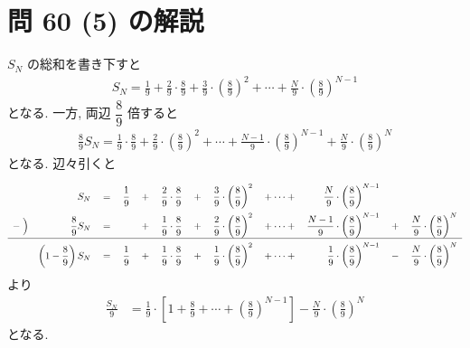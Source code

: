 
\section{問 60 (5) の解説}
\label{問 60 (5) の解説}
$S_{N}$ の総和を書き下すと
\begin{align}
	S_{N} = \frac{1}{9} + \frac{2}{9}\cdot\frac{8}{9} + \frac{3}{9}\cdot\left(\frac{8}{9}\right)^{2} + \cdots + \frac{N}{9}\cdot\left(\frac{8}{9}\right)^{N - 1}
\end{align}
となる.
一方, 両辺 $\dfrac{8}{9}$ 倍すると
\begin{align}
	\frac{8}{9}S_{N} = \frac{1}{9}\cdot\frac{8}{9} + \frac{2}{9}\cdot\left(\frac{8}{9}\right)^{2} + \cdots + \frac{N - 1}{9}\cdot\left(\frac{8}{9}\right)^{N - 1} + \frac{N}{9}\cdot\left(\frac{8}{9}\right)^{N}
\end{align}
となる.
辺々引くと
\begin{align}
	\def\arraystretch{2.5}
	\begin{array}{rrcrcrcrcrcr}
		        & S_{N}                              & {}={} & \dfrac{1}{9} & {}+{} & \dfrac{2}{9}\cdot\dfrac{8}{9} & {}+{} & \dfrac{3}{9}\cdot\left(\dfrac{8}{9}\right)^{2} & {}+ \cdots + {} & \dfrac{N}{9}\cdot\left(\dfrac{8}{9}\right)^{N - 1}     &       & \\
		-\Bigm) & \dfrac{8}{9}S_{N}                  & {}={} &              & {}+{} & \dfrac{1}{9}\cdot\dfrac{8}{9} & {}+{} & \dfrac{2}{9}\cdot\left(\dfrac{8}{9}\right)^{2} & {}+ \cdots + {} & \dfrac{N - 1}{9}\cdot\left(\dfrac{8}{9}\right)^{N - 1} & {}+{} & \dfrac{N}{9}\cdot\left(\dfrac{8}{9}\right)^{N} \\ \hline
		        & \left(1 - \dfrac{8}{9}\right)S_{N} & {}={} & \dfrac{1}{9} & {}+{} & \dfrac{1}{9}\cdot\dfrac{8}{9} & {}+{} & \dfrac{1}{9}\cdot\left(\dfrac{8}{9}\right)^{2} & {}+ \cdots + {} & \dfrac{1}{9}\cdot\left(\dfrac{8}{9}\right)^{N - 1}     & {}-{} & \dfrac{N}{9}\cdot\left(\dfrac{8}{9}\right)^{N}
	\end{array}
\end{align}
より
\begin{align}
	\frac{S_{N}}{9} &= \frac{1}{9}\cdot\left[1 + \frac{8}{9} + \cdots + \left(\frac{8}{9}\right)^{N - 1}\right] - \frac{N}{9}\cdot\left(\frac{8}{9}\right)^{N}
\end{align}
となる.